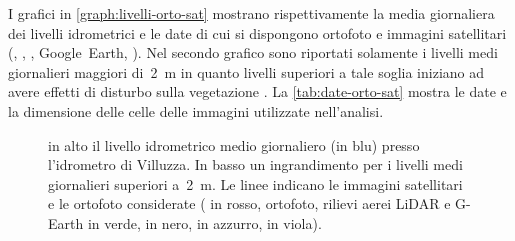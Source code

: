 I grafici in \vref{graph:livelli-orto-sat} mostrano rispettivamente la media giornaliera dei livelli idrometrici e le date di cui si dispongono ortofoto e immagini satellitari (\AST{}, \Pl{}, \Se{}, Google~Earth, \WV{}). 
Nel secondo grafico sono riportati solamente i livelli medi giornalieri maggiori di~\SI{2}{\m} in quanto livelli superiori a tale soglia iniziano ad avere effetti di disturbo sulla vegetazione .
La \vref{tab:date-orto-sat} mostra le date e la dimensione delle celle delle immagini utilizzate nell'analisi.
\begin{figure}[p]
	\centering
	
	
	\caption[livelli idrometrici e foto aeree - satellitari]{in alto il livello idrometrico medio giornaliero (in blu) presso l'idrometro di Villuzza. 
	In basso un ingrandimento per i livelli medi giornalieri superiori a~\SI{2}{\m}. Le linee indicano le immagini satellitari e le ortofoto considerate (\AST{} in rosso, ortofoto, rilievi aerei LiDAR e G-Earth in verde, \Pl{} in nero, \Se{} in azzurro, \WV{} in viola).}
	\label{graph:livelli-orto-sat}
\end{figure}
